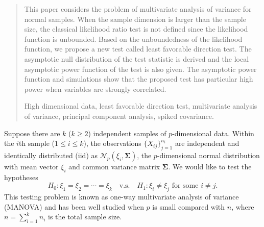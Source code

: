\documentclass[12pt]{article} %
\renewcommand{\theequation}{\thesection\arabic{equation}}
\newcommand{\bfsym}[1]{\ensuremath{\boldsymbol{#1}}}
\def\bSigma {\bfsym {\Sigma}}
\theoremstyle{definition}
\begin{document}
\begin{quotation}
This paper considers the problem of multivariate analysis of variance for normal samples.
    When the sample dimension is larger than the sample size, the classical likelihood ratio test is not defined since the likelihood function is unbounded.
    Based on the unboundedness of the likelihood function, we propose a new test called least favorable direction test.
    The asymptotic null distribution of the test statistic is derived and the local asymptotic power function of the test is also given.
    The asymptotic power function and simulations show that the proposed test has particular high power when variables are strongly correlated.

\vspace{9pt}
    High dimensional data, least favorable direction test, multivariate analysis of variance, principal component analysis, spiked covariance.
\par
\end{quotation}\par



\def\thefigure{\arabic{figure}}
\def\thetable{\arabic{table}}

\renewcommand{\theequation}{\thesection.\arabic{equation}}


\fontsize{12}{14pt plus.8pt minus .6pt}\selectfont

\setcounter{section}{1} %
\setcounter{equation}{0} %

Suppose there are $k$ ($k\geq 2$) independent samples of $p$-dimensional data.
Within the $i$th sample ($1\leq i\leq k$), the observations $\{X_{ij}\}_{j=1}^{n_i}$ are independent and identically distributed (iid) as $\mathcal{N}_p(\xi_i,\bSigma)$, the $p$-dimensional normal distribution with mean vector $\xi_i$ and common variance matrix $\bSigma$.
We would like to test the hypotheses
\begin{equation}\label{hypothesis}
    H_0: \xi_1=\xi_2=\cdots=\xi_k\quad \text{v.s.}\quad　H_1: \text{$\xi_i\neq \xi_j$ for some $i\neq j$}.
\end{equation}
This testing problem is known as one-way multivariate analysis of variance (MANOVA) and has been well studied when $p$ is small compared with $n$, where $n=\sum_{i=1}^k n_i$ is the total sample size.
\end{document}
